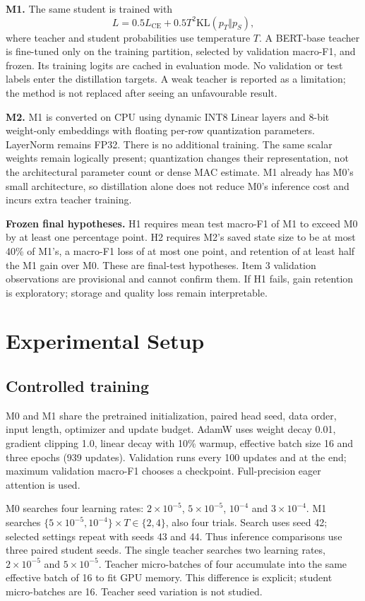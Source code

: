 \documentclass[11pt]{article}
\begin{document}
\textbf{M1.} The same student is trained with
\begin{equation}
L=0.5L_{\mathrm{CE}}+0.5T^2\mathrm{KL}(p_T\Vert p_S),
\end{equation}
where teacher and student probabilities use temperature $T$. A BERT-base teacher is fine-tuned only on the training partition, selected by validation macro-F1, and frozen. Its training logits are cached in evaluation mode. No validation or test labels enter the distillation targets. A weak teacher is reported as a limitation; the method is not replaced after seeing an unfavourable result.

\textbf{M2.} M1 is converted on CPU using dynamic INT8 Linear layers and 8-bit weight-only embeddings with floating per-row quantization parameters. LayerNorm remains FP32. There is no additional training. The same scalar weights remain logically present; quantization changes their representation, not the architectural parameter count or dense MAC estimate. M1 already has M0's small architecture, so distillation alone does not reduce M0's inference cost and incurs extra teacher training.

\textbf{Frozen final hypotheses.} H1 requires mean test macro-F1 of M1 to exceed M0 by at least one percentage point. H2 requires M2's saved state size to be at most 40\% of M1's, a macro-F1 loss of at most one point, and retention of at least half the M1 gain over M0. These are final-test hypotheses. Item 3 validation observations are provisional and cannot confirm them. If H1 fails, gain retention is exploratory; storage and quality loss remain interpretable.

\section{Experimental Setup}
\subsection{Controlled training}
M0 and M1 share the pretrained initialization, paired head seed, data order, input length, optimizer and update budget. AdamW uses weight decay 0.01, gradient clipping 1.0, linear decay with 10\% warmup, effective batch size 16 and three epochs (939 updates). Validation runs every 100 updates and at the end; maximum validation macro-F1 chooses a checkpoint. Full-precision eager attention is used.

M0 searches four learning rates: $2\times10^{-5}$, $5\times10^{-5}$, $10^{-4}$ and $3\times10^{-4}$. M1 searches $\{5\times10^{-5},10^{-4}\}\times T\in\{2,4\}$, also four trials. Search uses seed 42; selected settings repeat with seeds 43 and 44. Thus inference comparisons use three paired student seeds. The single teacher searches two learning rates, $2\times10^{-5}$ and $5\times10^{-5}$. Teacher micro-batches of four accumulate into the same effective batch of 16 to fit GPU memory. This difference is explicit; student micro-batches are 16. Teacher seed variation is not studied.
\end{document}
